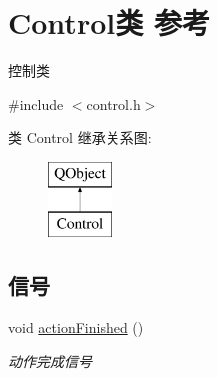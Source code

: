 \hypertarget{class_control}{}\section{Control类 参考}
\label{class_control}


控制类  




{\ttfamily \#include $<$control.\+h$>$}

类 Control 继承关系图\+:\begin{figure}[H]
\begin{center}
\leavevmode
\includegraphics[height=2.000000cm]{class_control}
\end{center}
\end{figure}
\subsection*{信号}
\begin{DoxyCompactItemize}
\item 
\hypertarget{class_control_aa3dfe35b337f0342abc4aaa9b25d334a}{}void \hyperlink{class_control_aa3dfe35b337f0342abc4aaa9b25d334a}{action\+Finished} ()\label{class_control_aa3dfe35b337f0342abc4aaa9b25d334a}

\begin{DoxyCompactList}\small\item\em 动作完成信号 \end{DoxyCompactList}\end{DoxyCompactItemize}
